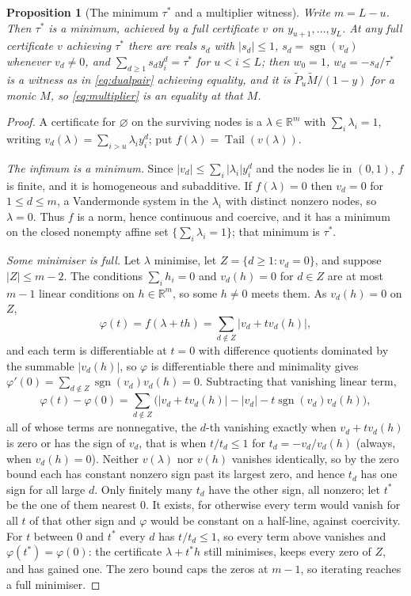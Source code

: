 \documentclass[11pt]{article}
\newtheorem{proposition}[theorem]{Proposition}
\theoremstyle{definition}
\theoremstyle{plain}
\newcommand{\R}{\mathbb R}
\DeclareMathOperator{\Tail}{Tail}
\DeclareMathOperator{\sgn}{sgn}
\begin{document}
\begin{proposition}[The minimum $\tau^*$ and a multiplier witness]\label{prop:attain}
Write $m=L-u$.  Then $\tau^*$ is a minimum, achieved by a full certificate $v$ on
$y_{u+1},\ldots,y_L$.  At any full certificate $v$ achieving $\tau^*$ there are reals $s_d$ with
$|s_d|\le1$, $s_d=\sgn(v_d)$ whenever $v_d\ne0$, and
$\sum_{d\ge1}s_dy_i^d=\tau^*$ for $u<i\le L$; then $w_0=1$,
$w_d=-s_d/\tau^*$ is a witness as in \eqref{eq:dualpair} achieving equality,
and it is $\widetilde P_u\widetilde M/(1-y)$ for a monic $M$, so
\eqref{eq:multiplier} is an equality at that $M$.
\end{proposition}

\begin{proof}
A certificate for $\varnothing$ on the surviving nodes is a
$\lambda\in\R^m$ with $\sum_i\lambda_i=1$, writing
$v_d(\lambda)=\sum_{i>u}\lambda_iy_i^d$; put $f(\lambda)=\Tail(v(\lambda))$.

\emph{The infimum is a minimum.}  Since $|v_d|\le\sum_i|\lambda_i|y_i^d$ and
the nodes lie in $(0,1)$, $f$ is finite, and it is homogeneous and
subadditive.  If $f(\lambda)=0$ then $v_d=0$ for $1\le d\le m$, a Vandermonde
system in the $\lambda_i$ with distinct nonzero nodes, so $\lambda=0$.  Thus
$f$ is a norm, hence continuous and coercive, and it has a minimum on
the closed nonempty affine set $\{\sum_i\lambda_i=1\}$; that minimum is
$\tau^*$.

\emph{Some minimiser is full.}  Let $\lambda$ minimise, let
$Z=\{d\ge1:v_d=0\}$, and suppose $|Z|\le m-2$.  The conditions
$\sum_ih_i=0$ and $v_d(h)=0$ for $d\in Z$ are at most $m-1$ linear
conditions on $h\in\R^m$, so some $h\ne0$ meets them.  As $v_d(h)=0$ on $Z$,
\[
  \varphi(t)=f(\lambda+th)=\sum_{d\notin Z}\bigl|v_d+tv_d(h)\bigr|,
\]
and each term is differentiable at $t=0$ with difference quotients dominated
by the summable $|v_d(h)|$, so $\varphi$ is differentiable there and
minimality gives $\varphi'(0)=\sum_{d\notin Z}\sgn(v_d)v_d(h)=0$.
Subtracting that vanishing linear term,
\[
  \varphi(t)-\varphi(0)=\sum_{d\notin Z}
  \bigl(|v_d+tv_d(h)|-|v_d|-t\sgn(v_d)v_d(h)\bigr),
\]
all of whose terms are nonnegative, the $d$-th vanishing exactly when
$v_d+tv_d(h)$ is zero or has the sign of $v_d$, that is when $t/t_d\le1$ for
$t_d=-v_d/v_d(h)$ (always, when $v_d(h)=0$).  Neither $v(\lambda)$ nor
$v(h)$ vanishes identically, so by the zero bound each has constant nonzero
sign past its largest zero, and hence $t_d$ has one sign for all large $d$.
Only finitely many $t_d$ have the other sign, all nonzero; let $t^*$ be the
one of them nearest $0$.  It exists, for otherwise every term would vanish
for all $t$ of that other sign and $\varphi$ would be constant on a
half-line, against coercivity.  For $t$ between $0$ and $t^*$ every $d$ has
$t/t_d\le1$, so every term above vanishes and
$\varphi(t^*)=\varphi(0)$: the certificate $\lambda+t^*h$ still minimises,
keeps every zero of $Z$, and has gained one.  The zero bound caps the zeros
at $m-1$, so iterating reaches a full minimiser.


\end{proof}
\end{document}
